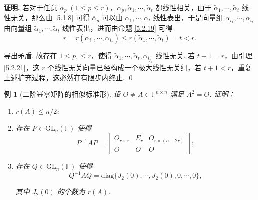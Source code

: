\documentclass[10pt,openany]{article}
\theoremstyle{thmstyle} %
\theoremstyle{defstyle} %
\theoremstyle{prostyle} %
\theoremstyle{exastyle}
\newtheorem{example}[theorem]{例}
\theoremstyle{remstyle}
\renewenvironment{proof}[1][证明]{\par\underline{\textbf{#1.}} \;\fangsong}{\qed\par}
\newcommand{\F}{\mathbb{F}}
\newcommand{\gfn}{\text{GL}_n(\mathbb{F})}
\newcommand{\n}{^{n \times n}}
\newcommand{\diag}{\mathrm{diag}}
\begin{document}
\begin{proof}
	若对于任意 \( \overline{\alpha}_p \; (1 \leq p \leq r) \)，\( \overline{\alpha}_p, \widetilde{\alpha}_1,\cdots,\widetilde{\alpha}_t \) 都线性相关，由于 \( \widetilde{\alpha}_1,\cdots,\widetilde{\alpha}_t \) 线性无关，那么由 \ref{5.1.8} 可得 \( \overline{\alpha}_p \) 可以由 \( \widetilde{\alpha}_1,\cdots,\widetilde{\alpha}_t \) 线性表出，于是向量组 \( \alpha_{i_1},\cdots,\alpha_{i_r} \) 由向量组 \( \widetilde{\alpha}_1,\cdots,\widetilde{\alpha}_t \) 线性表出，进而由命题 \ref{5.2.19} 可得
	\[ r=r(\alpha_{i_1},\cdots,\alpha_{i_r}) \leq r(\widetilde{\alpha}_1,\cdots,\widetilde{\alpha}_t)=t<r. \]
	
	导出矛盾. 故存在 \( 1 \leq p_1 \leq r \)，使得 \( \widetilde{\alpha}_1,\cdots,\widetilde{\alpha}_t,\alpha_{i_{p_1}} \) 线性无关. 若 \( t+1=r \)，由引理 \ref{5.2.21}，这 \( r \) 个线性无关向量已经构成一个极大线性无关组，若 \( t+1<r \)，重复上述扩充过程，这必然在有限步内终止.
\end{proof}


\begin{example}[二阶幂零矩阵的相似标准形]
	设 \( O \neq A \in \F\n \) 满足 \( A^2=O \). 证明：
	\begin{enumerate}[(1)]
		\item \( r(A) \leq n/2 \);
		\item 存在 \( P \in \gfn \) 使得
		\[ P^{-1}AP=\begin{bmatrix}
			O_{r \times r} & E_r & O_{r \times (n-2r)} \\
			O & O & O
		\end{bmatrix}; \]
		\item 存在 \( Q \in \gfn \) 使得
		\[ Q^{-1}AQ= \diag\{J_2(0),\cdots,J_2(0),0,\cdots,0\}, \]
		
		其中 \( J_2(0) \) 的个数为 \( r(A) \).
	\end{enumerate}
\end{example}
\end{document}
